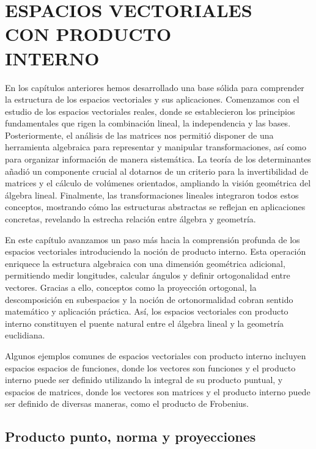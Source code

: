\chapter[ESPACIOS VECTORIALES CON PRODUCTO INTERNO]{ESPACIOS VECTORIALES \\ CON PRODUCTO \\ INTERNO}

En los capítulos anteriores hemos desarrollado una base sólida para comprender la estructura de los espacios vectoriales y sus aplicaciones. Comenzamos con el estudio de los espacios vectoriales reales, donde se establecieron los principios fundamentales que rigen la combinación lineal, la independencia y las bases. Posteriormente, el análisis de las matrices nos permitió disponer de una herramienta algebraica para representar y manipular transformaciones, así como para organizar información de manera sistemática. La teoría de los determinantes añadió un componente crucial al dotarnos de un criterio para la invertibilidad de matrices y el cálculo de volúmenes orientados, ampliando la visión geométrica del álgebra lineal. Finalmente, las transformaciones lineales integraron todos estos conceptos, mostrando cómo las estructuras abstractas se reflejan en aplicaciones concretas, revelando la estrecha relación entre álgebra y geometría.

En este capítulo avanzamos un paso más hacia la comprensión profunda de los espacios vectoriales introduciendo la noción de producto interno. Esta operación enriquece la estructura algebraica con una dimensión geométrica adicional, permitiendo medir longitudes, calcular ángulos y definir ortogonalidad entre vectores. Gracias a ello, conceptos como la proyección ortogonal, la descomposición en subespacios y la noción de ortonormalidad cobran sentido matemático y aplicación práctica. Así, los espacios vectoriales con producto interno constituyen el puente natural entre el álgebra lineal y la geometría euclidiana.

\newpage

Algunos ejemplos comunes de espacios vectoriales con producto interno incluyen espacios espacios de funciones, donde los vectores son funciones y el producto interno puede ser definido utilizando la integral de su producto puntual, y espacios de matrices, donde los vectores son matrices y el producto interno puede ser definido de diversas maneras, como el producto de Frobenius.

\section{Producto punto, norma y proyecciones}\label{sec:orto}


